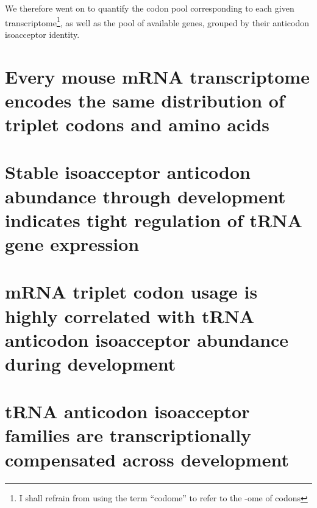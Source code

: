 We therefore went on to quantify the codon pool corresponding to each given
transcriptome\footnote{I shall refrain from using the term “codome” to refer to
the -ome of codons}, as well as the pool of available \trna genes, grouped by
their anticodon isoacceptor identity.


\section{Every mouse mRNA transcriptome encodes the same distribution of
triplet codons and amino acids}

\section{Stable isoacceptor anticodon abundance through development indicates
tight regulation of tRNA gene expression}

\section{mRNA triplet codon usage is highly correlated with tRNA anticodon
isoacceptor abundance during development}

\section{tRNA anticodon isoacceptor families are transcriptionally compensated
across development}
